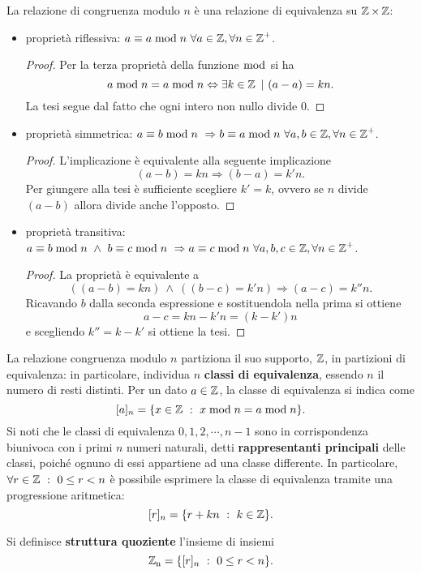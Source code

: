 La relazione di congruenza modulo $n$ è una relazione di equivalenza su $\operatorname*{\mathbb{Z}}\times\operatorname*{\mathbb{Z}}$:
\begin{itemize}
\item proprietà riflessiva: $a \equiv a\bmod n\ \forall a\in\operatorname*{\mathbb{Z}}, \forall n\in\operatorname*{\mathbb{Z}}^+$.
\begin{proof}
Per la terza proprietà della funzione $\bmod$ si ha 
\[
a\bmod n = a\bmod n \Leftrightarrow \exists k\in\operatorname*{\mathbb{Z}}\ |\ (a-a)=kn.
\]
La tesi segue dal fatto che ogni intero non nullo divide $0$.
\end{proof}
\item proprietà simmetrica: $a \equiv b\bmod n\ \Rightarrow b \equiv a\bmod n\ \forall a,b\in\operatorname*{\mathbb{Z}}, \forall n\in\operatorname*{\mathbb{Z}}^+$.
\begin{proof}
L'implicazione è equivalente alla seguente implicazione
\[
(a-b)=kn \Rightarrow (b-a)=k'n.
\]
Per giungere alla tesi è sufficiente scegliere $k'=k$, ovvero se $n$ divide $(a-b)$ allora divide anche l'opposto.
\end{proof}
\item proprietà transitiva: $a \equiv b\bmod n\ \land\ b \equiv c\bmod n\ \Rightarrow a \equiv c\bmod n\ \forall a,b,c\in\operatorname*{\mathbb{Z}}, \forall n\in\operatorname*{\mathbb{Z}}^+$.
\begin{proof}
La proprietà è equivalente a
\[
((a-b)=kn)\ \land\ ((b-c)=k'n) \Rightarrow (a-c)=k''n.
\]
Ricavando $b$ dalla seconda espressione e sostituendola nella prima si ottiene
\[
a-c=kn-k'n=(k-k')n
\]
e scegliendo $k''=k-k'$ si ottiene la tesi.
\end{proof}
\end{itemize}

La relazione congruenza modulo $n$ partiziona il suo supporto, $\operatorname*{\mathbb{Z}}$, in partizioni di equivalenza: in particolare, individua $n$ \textbf{classi di equivalenza}, essendo $n$ il numero di resti distinti. Per un dato $a\in\operatorname*{\mathbb{Z}}$, la classe di equivalenza si indica come
\[
[a]_n = \{x\in\operatorname*{\mathbb{Z}}\ :\ x\bmod n = a\bmod n\}.
\]
Si noti che le classi di equivalenza $0, 1, 2, \cdots , n-1$ sono in corrispondenza biunivoca con i primi $n$ numeri naturali, detti \textbf{rappresentanti principali} delle classi, poiché ognuno di essi appartiene ad una classe differente. In particolare, $\forall r\in\operatorname*{\mathbb{Z}}\ :\ 0\leq r < n$ è possibile esprimere la classe di equivalenza tramite una progressione aritmetica:
\[
[r]_n=\{r+kn\ :\ k\in\Z\}.
\]

\begin{definizione}
Si definisce \textbf{struttura quoziente} l'insieme di insiemi
\[
\operatorname*{\mathbb{Z}_n}=\{[r]_n\ :\ 0\leq r < n\}.
\]
\end{definizione}

